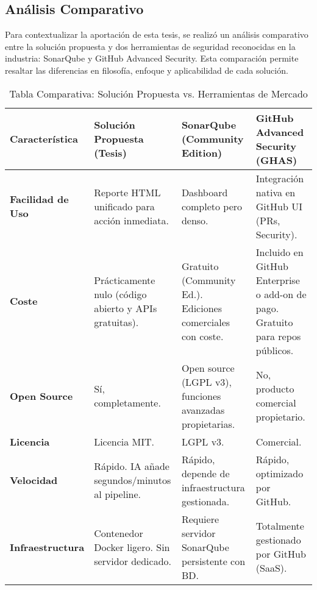 \subsection{Análisis Comparativo}

Para contextualizar la aportación de esta tesis, se realizó un análisis comparativo entre la solución propuesta y dos herramientas de seguridad reconocidas en la industria: SonarQube y GitHub Advanced Security. Esta comparación permite resaltar las diferencias en filosofía, enfoque y aplicabilidad de cada solución.

\begin{table}[h!]
\centering
\caption{Tabla Comparativa: Solución Propuesta vs. Herramientas de Mercado}
\label{tab:comparativa_sistemas}
\begin{tabular}{|p{2.6cm}|p{3.9cm}|p{3.9cm}|p{3.9cm}|}
\hline
\textbf{Característica} & 
\textbf{Solución Propuesta (Tesis)} & 
\textbf{SonarQube (Community Edition)} \cite{sonarqube_editions} & 
\textbf{GitHub Advanced Security (GHAS)} \cite{ghas_docs} \\ \hline

\textbf{Facilidad de Uso} & 
Reporte HTML unificado para acción inmediata. & 
Dashboard completo pero denso. & 
Integración nativa en GitHub UI (PRs, Security). \\ \hline

\textbf{Coste} & 
Prácticamente nulo (código abierto y APIs gratuitas). & 
Gratuito (Community Ed.). Ediciones comerciales con coste. & 
Incluido en GitHub Enterprise o add-on de pago. Gratuito para repos públicos. \\ \hline

\textbf{Open Source} & 
Sí, completamente. & 
Open source (LGPL v3), funciones avanzadas propietarias. & 
No, producto comercial propietario. \\ \hline

\textbf{Licencia} & Licencia MIT. & LGPL v3. & Comercial. \\ \hline

\textbf{Velocidad} & 
Rápido. IA añade segundos/minutos al pipeline. & 
Rápido, depende de infraestructura gestionada. & 
Rápido, optimizado por GitHub. \\ \hline

\textbf{Infraestructura} & 
Contenedor Docker ligero. Sin servidor dedicado. & 
Requiere servidor SonarQube persistente con BD. & 
Totalmente gestionado por GitHub (SaaS). \\ \hline


\end{tabular}
\end{table}
